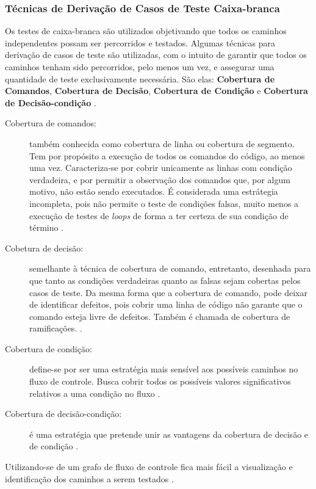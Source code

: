 \subsubsection{Técnicas de Derivação de Casos de Teste Caixa-branca}
Os testes de caixa-branca são utilizados objetivando que todos os caminhos independentes possam ser percorridos e testados. Algumas técnicas para derivação de casos de teste são utilizadas, com o intuito de garantir que todos os caminhos tenham sido percorridos, pelo menos um vez, e assegurar uma quantidade de teste exclusivamente necessária. São elas: \textbf{Cobertura de Comandos}, \textbf{Cobertura de Decisão}, \textbf{Cobertura de Condição} e \textbf{Cobertura de Decisão-condição} \cite{istqb2014}.

\begin{description}
\item[Cobertura de comandos:] também conhecida como cobertura de linha ou cobertura de segmento. Tem por propósito a execução de todos os comandos do código, ao menos uma vez. Caracteriza-se por cobrir unicamente as linhas com condição verdadeira, e por permitir a observação dos comandos que, por algum motivo, não estão sendo executados. É considerada uma estrátegia incompleta, pois não permite o teste de condições falsas, muito menos a execução de testes de \textit{loops} de forma a ter certeza de sua condição de término \cite{istqb2014}.
\item[Cobetura de decisão:] semelhante à técnica de cobertura de comando, entretanto, desenhada para que tanto as condições verdadeiras quanto as falsas sejam cobertas pelos casos de teste. Da mesma forma que a cobertura de comando, pode deixar de identificar defeitos, pois cobrir uma linha de código não garante que o comando esteja livre de defeitos. Também é chamada de cobertura de ramificações. \cite{istqb2014}.
\item[Cobertura de condição:] define-se por ser uma estratégia mais sensível aos possíveis caminhos no fluxo de controle. Busca cobrir todos os possíveis valores significativos relativos a uma condição no fluxo \cite{istqb2014}.
\item[Cobertura de decisão-condição:] é uma estratégia que pretende unir as vantagens da cobertura de decisão e de condição \cite{istqb2014}.
\end{description}
\par
\indent Utilizando-se de um grafo de fluxo de controle fica mais fácil a visualização e identificação dos caminhos a serem testados \cite{copeland2003}.
\par
